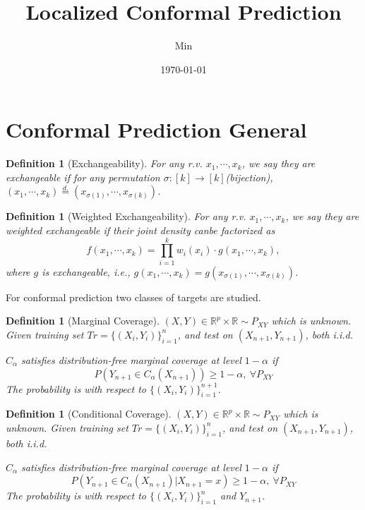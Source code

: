 \documentclass[12pt, a4paper, oneside]{article}
\title{\textbf{Localized Conformal Prediction}}
\author{Min}
\date{\today}
\newtheorem{definition}[theorem]{Definition}
\begin{document}
\maketitle
\setcounter{page}{1}
\section[Section title sans citation]{Conformal Prediction General\cite{angelopoulos2023conformal}}
    \begin{definition}[Exchangeability]\cite{shafer2008tutorial}
        For any r.v. $x_1,\cdots,x_k$, we say they are exchangeable if for any permutation $\sigma:[k]\rightarrow[k]$(bijection), $(x_1,\cdots,x_k)\overset{d.}{=}(x_{\sigma(1)},\cdots,x_{\sigma(k)})$.
    \end{definition}


    \begin{definition}[Weighted Exchangeability]\cite{tibshirani2019conformal}
        For any r.v. $x_1,\cdots,x_k$, we say they are weighted exchangeable if their joint density canbe factorized as
        \begin{equation*}
            f(x_1,\cdots,x_k)=\overset{k}{\underset{i=1}{\prod}}w_i(x_i)\cdot g(x_1,\cdots,x_k),
        \end{equation*}
        where $g$ is exchangeable, i.e., $g(x_1,\cdots,x_k)=g(x_{\sigma(1)},\cdots,x_{\sigma(k)})$.
    \end{definition}


    For conformal prediction two classes of targets are studied.
    \begin{definition}[Marginal Coverage]
        $(X,Y)\in\mathbb{R}^p\times\mathbb{R}\sim P_{XY}$ which is unknown. Given training set $Tr=\{(X_i,Y_i)\}_{i=1}^n$, and test on $(X_{n+1},Y_{n+1})$, both i.i.d.


        $C_\alpha$  satisfies distribution-free marginal coverage at level $1-\alpha$ if
        \begin{equation*}
            P(Y_{n+1}\in C_\alpha(X_{n+1}))\geq 1-\alpha,\ \forall P_{XY}
        \end{equation*}
        The probability is with respect to $\{(X_i,Y_i)\}_{i=1}^{n+1}$.
    \end{definition}


    \begin{definition}[Conditional Coverage]
        $(X,Y)\in\mathbb{R}^p\times\mathbb{R}\sim P_{XY}$ which is unknown. Given training set $Tr=\{(X_i,Y_i)\}_{i=1}^n$, and test on $(X_{n+1},Y_{n+1})$, both i.i.d.


        $C_\alpha$  satisfies distribution-free marginal coverage at level $1-\alpha$ if
        \begin{equation*}
            P\left( Y_{n+1}\in C_\alpha(X_{n+1})\Big|X_{n+1}=x \right)\geq 1-\alpha,\ \forall P_{XY}
        \end{equation*}
        The probability is with respect to $\{(X_i,Y_i)\}_{i=1}^n$ and $Y_{n+1}$.
    \end{definition}
\end{document}
